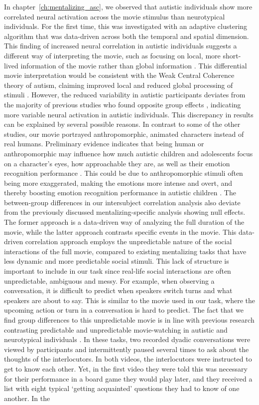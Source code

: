 In chapter~\ref{ch:mentalizing_asc}, we observed that autistic individuals show more correlated neural activation across the movie stimulus than neurotypical individuals. For the first time, this was investigated with an adaptive clustering algorithm that was data-driven across both the temporal and spatial dimension. This finding of increased neural correlation in autistic individuals suggests a different way of interpreting the movie, such as focusing on local, more short-lived information of the movie rather than global information \citep{barnes2012,geelhand2020}. This differential movie interpretation would be consistent with the Weak Central Coherence theory of autism, claiming improved local and reduced global processing of stimuli \citep{happe1997}. However, the reduced variability in autistic participants deviates from the majority of previous studies who found opposite group effects \citep{byrge2015,hasson2009,lyons2020,salmi2013}, indicating more variable neural activation in autistic individuals. This discrepancy in results can be explained by several possible reasons. In contrast to some of the other studies, our movie portrayed anthropomorphic, animated characters instead of real humans. Preliminary evidence indicates that being human or anthropomorphic may influence how much autistic children and adolescents focus on a character's eyes, how approachable they are, as well as their emotion recognition performance \citep{atherton2018}. This could be due to anthropomorphic stimuli often being more exaggerated, making the emotions more intense and overt, and thereby boosting emotion recognition performance in autistic children \citep{carter2016,rump2009}. The between-group differences in our intersubject correlation analysis also deviate from the previously discussed mentalizing-specific analysis showing null effects. The former approach is a data-driven way of analyzing the full duration of the movie, while the latter approach contrasts specific events in the movie. This data-driven correlation approach employs the unpredictable nature of the social interactions of the full movie, compared to existing mentalizing tasks that have less dynamic and more predictable social stimuli. This lack of structure is important to include in our task since real-life social interactions are often unpredictable, ambiguous and messy. For example, when observing a conversation, it is difficult to predict when speakers switch turns and what speakers are about to say. This is similar to the movie used in our task, where the upcoming action or turn in a conversation is hard to predict. The fact that we find group differences to this unpredictable movie is in line with previous research contrasting predictable and unpredictable movie-watching in autistic and neurotypical individuals \citep{roeyers2001,ponnet2008}. In these tasks, two recorded dyadic conversations were viewed by participants and intermittently paused several times to ask about the thoughts of the interlocutors. In both videos, the interlocutors were instructed to get to know each other. Yet, in the first video they were told this was necessary for their performance in a board game they would play later, and they received a list with eight typical `getting acquainted' questions they had to know of one another. In the 